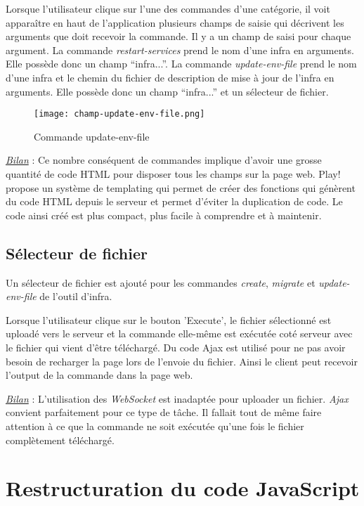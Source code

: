 Lorsque l'utilisateur clique sur l'une des commandes d'une catégorie, il voit
apparaître en haut de l'application plusieurs champs de saisie qui décrivent les
arguments que doit recevoir la commande.
Il y a un champ de saisi pour chaque argument.
La commande \textit{restart-services} prend le nom d'une infra en
arguments. Elle possède donc un champ ``infra...''.
La commande \textit{update-env-file} prend le nom d'une infra et le chemin du
fichier de description de mise à jour de l'infra en arguments. Elle possède donc
un champ ``infra...'' et un sélecteur de fichier.

\begin{figure}[H]
  \begin{center}
    \texttt{[image: champ-update-env-file.png]} 
  \end{center}
  \caption{Commande update-env-file} 
\end{figure}

\underline{\textit{Bilan}} : Ce nombre conséquent de commandes implique d'avoir
une grosse quantité de code HTML pour disposer tous les champs sur la
page web. Play! propose un système de templating qui permet de créer des
fonctions qui génèrent du code HTML depuis le serveur et permet d'éviter la
duplication de code. Le code ainsi créé est plus compact, plus facile à
comprendre et à maintenir.

\subsection{Sélecteur de fichier}

Un sélecteur de fichier est ajouté pour les commandes \textit{create},
\textit{migrate} et \textit{update-env-file} de l'outil d'infra.

Lorsque l'utilisateur clique sur le bouton 'Execute', le fichier sélectionné est
uploadé vers le serveur et la commande elle-même est exécutée coté serveur avec
le fichier qui vient d'être téléchargé.
Du code Ajax est utilisé pour ne pas avoir besoin de recharger la page lors de
l'envoie du fichier.
Ainsi le client peut recevoir l'output de la commande dans la page web.

\underline{\textit{Bilan}} : L'utilisation des \textit{WebSocket} est inadaptée
pour uploader un fichier. \textit{Ajax} convient parfaitement pour ce type de
tâche. Il fallait tout de même faire attention à ce que la commande ne soit
exécutée qu'une fois le fichier complètement téléchargé.

\section{Restructuration du code JavaScript}

